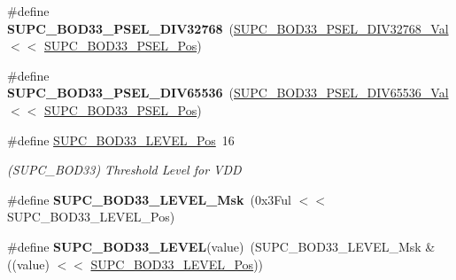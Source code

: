 \begin{DoxyCompactItemize}
\item 
\hypertarget{group___s_a_m_l21___s_u_p_c_ga1b9ff1701dd91df1ba620b23e7887c23}{}\#define {\bfseries S\+U\+P\+C\+\_\+\+B\+O\+D33\+\_\+\+P\+S\+E\+L\+\_\+\+D\+I\+V32768}~(\hyperlink{group___s_a_m_l21___s_u_p_c_ga779c601dbb7b47718a6d701958f823ff}{S\+U\+P\+C\+\_\+\+B\+O\+D33\+\_\+\+P\+S\+E\+L\+\_\+\+D\+I\+V32768\+\_\+\+Val}  $<$$<$ \hyperlink{group___s_a_m_l21___s_u_p_c_ga749aed0ecd13c1a62c80e107cfe7e31f}{S\+U\+P\+C\+\_\+\+B\+O\+D33\+\_\+\+P\+S\+E\+L\+\_\+\+Pos})\label{group___s_a_m_l21___s_u_p_c_ga1b9ff1701dd91df1ba620b23e7887c23}

\item 
\hypertarget{group___s_a_m_l21___s_u_p_c_gabd8b00da6cd6d1ae8e00bc68f2bbf500}{}\#define {\bfseries S\+U\+P\+C\+\_\+\+B\+O\+D33\+\_\+\+P\+S\+E\+L\+\_\+\+D\+I\+V65536}~(\hyperlink{group___s_a_m_l21___s_u_p_c_gaa28f950cc527b402bcd9e110ec4aa4b4}{S\+U\+P\+C\+\_\+\+B\+O\+D33\+\_\+\+P\+S\+E\+L\+\_\+\+D\+I\+V65536\+\_\+\+Val}  $<$$<$ \hyperlink{group___s_a_m_l21___s_u_p_c_ga749aed0ecd13c1a62c80e107cfe7e31f}{S\+U\+P\+C\+\_\+\+B\+O\+D33\+\_\+\+P\+S\+E\+L\+\_\+\+Pos})\label{group___s_a_m_l21___s_u_p_c_gabd8b00da6cd6d1ae8e00bc68f2bbf500}

\item 
\hypertarget{group___s_a_m_l21___s_u_p_c_gab4d56f6b465db566d13204d5b244d876}{}\#define \hyperlink{group___s_a_m_l21___s_u_p_c_gab4d56f6b465db566d13204d5b244d876}{S\+U\+P\+C\+\_\+\+B\+O\+D33\+\_\+\+L\+E\+V\+E\+L\+\_\+\+Pos}~16\label{group___s_a_m_l21___s_u_p_c_gab4d56f6b465db566d13204d5b244d876}

\begin{DoxyCompactList}\small\item\em (S\+U\+P\+C\+\_\+\+B\+O\+D33) Threshold Level for V\+D\+D \end{DoxyCompactList}\item 
\hypertarget{group___s_a_m_l21___s_u_p_c_gacf458f8beff11d1265c428cac97c2178}{}\#define {\bfseries S\+U\+P\+C\+\_\+\+B\+O\+D33\+\_\+\+L\+E\+V\+E\+L\+\_\+\+Msk}~(0x3\+Ful $<$$<$ S\+U\+P\+C\+\_\+\+B\+O\+D33\+\_\+\+L\+E\+V\+E\+L\+\_\+\+Pos)\label{group___s_a_m_l21___s_u_p_c_gacf458f8beff11d1265c428cac97c2178}

\item 
\hypertarget{group___s_a_m_l21___s_u_p_c_gab428ef2d5921d49846398192ed460259}{}\#define {\bfseries S\+U\+P\+C\+\_\+\+B\+O\+D33\+\_\+\+L\+E\+V\+E\+L}(value)~(S\+U\+P\+C\+\_\+\+B\+O\+D33\+\_\+\+L\+E\+V\+E\+L\+\_\+\+Msk \& ((value) $<$$<$ \hyperlink{group___s_a_m_l21___s_u_p_c_gab4d56f6b465db566d13204d5b244d876}{S\+U\+P\+C\+\_\+\+B\+O\+D33\+\_\+\+L\+E\+V\+E\+L\+\_\+\+Pos}))\label{group___s_a_m_l21___s_u_p_c_gab428ef2d5921d49846398192ed460259}


\end{DoxyCompactItemize}
